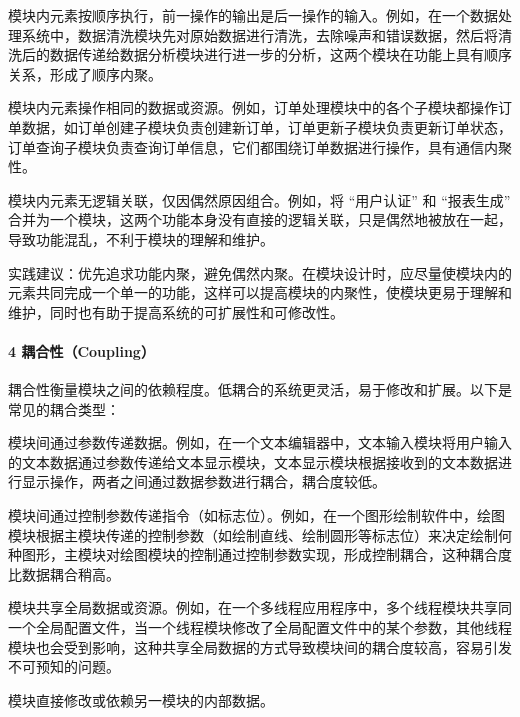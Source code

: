 模块内元素按顺序执行，前一操作的输出是后一操作的输入。例如，在一个数据处理系统中，数据清洗模块先对原始数据进行清洗，去除噪声和错误数据，然后将清洗后的数据传递给数据分析模块进行进一步的分析，这两个模块在功能上具有顺序关系，形成了顺序内聚。

模块内元素操作相同的数据或资源。例如，订单处理模块中的各个子模块都操作订单数据，如订单创建子模块负责创建新订单，订单更新子模块负责更新订单状态，订单查询子模块负责查询订单信息，它们都围绕订单数据进行操作，具有通信内聚性。

模块内元素无逻辑关联，仅因偶然原因组合。例如，将 ``用户认证'' 和 ``报表生成'' 合并为一个模块，这两个功能本身没有直接的逻辑关联，只是偶然地被放在一起，导致功能混乱，不利于模块的理解和维护。

实践建议：优先追求功能内聚，避免偶然内聚。在模块设计时，应尽量使模块内的元素共同完成一个单一的功能，这样可以提高模块的内聚性，使模块更易于理解和维护，同时也有助于提高系统的可扩展性和可修改性。

\hypertarget{ux8026ux5408ux6027coupling}{%
\paragraph{4 耦合性（Coupling）}\label{ux8026ux5408ux6027coupling}}

耦合性衡量模块之间的依赖程度。低耦合的系统更灵活，易于修改和扩展。以下是常见的耦合类型：

模块间通过参数传递数据。例如，在一个文本编辑器中，文本输入模块将用户输入的文本数据通过参数传递给文本显示模块，文本显示模块根据接收到的文本数据进行显示操作，两者之间通过数据参数进行耦合，耦合度较低。

模块间通过控制参数传递指令（如标志位）。例如，在一个图形绘制软件中，绘图模块根据主模块传递的控制参数（如绘制直线、绘制圆形等标志位）来决定绘制何种图形，主模块对绘图模块的控制通过控制参数实现，形成控制耦合，这种耦合度比数据耦合稍高。

模块共享全局数据或资源。例如，在一个多线程应用程序中，多个线程模块共享同一个全局配置文件，当一个线程模块修改了全局配置文件中的某个参数，其他线程模块也会受到影响，这种共享全局数据的方式导致模块间的耦合度较高，容易引发不可预知的问题。

模块直接修改或依赖另一模块的内部数据。

